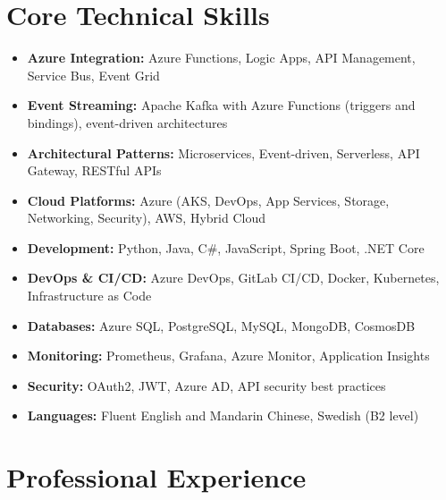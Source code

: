 \documentclass[11pt,a4paper]{article}
\begin{document}
\section*{Core Technical Skills}
\begin{itemize}[noitemsep]
\item \textbf{Azure Integration:} Azure Functions, Logic Apps, API Management, Service Bus, Event Grid
\item \textbf{Event Streaming:} Apache Kafka with Azure Functions (triggers and bindings), event-driven architectures
\item \textbf{Architectural Patterns:} Microservices, Event-driven, Serverless, API Gateway, RESTful APIs
\item \textbf{Cloud Platforms:} Azure (AKS, DevOps, App Services, Storage, Networking, Security), AWS, Hybrid Cloud
\item \textbf{Development:} Python, Java, C\#, JavaScript, Spring Boot, .NET Core
\item \textbf{DevOps \& CI/CD:} Azure DevOps, GitLab CI/CD, Docker, Kubernetes, Infrastructure as Code
\item \textbf{Databases:} Azure SQL, PostgreSQL, MySQL, MongoDB, CosmosDB
\item \textbf{Monitoring:} Prometheus, Grafana, Azure Monitor, Application Insights
\item \textbf{Security:} OAuth2, JWT, Azure AD, API security best practices
\item \textbf{Languages:} Fluent English and Mandarin Chinese, Swedish (B2 level)
\end{itemize}

\section*{Professional Experience}
\end{document}
